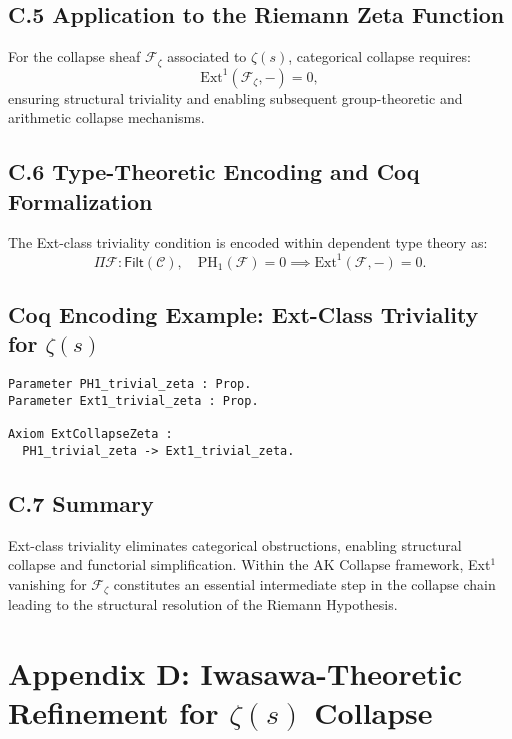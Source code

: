 \documentclass[11pt]{article}
\begin{document}
\subsection*{C.5 Application to the Riemann Zeta Function}

For the collapse sheaf $\mathcal{F}_{\zeta}$ associated to $\zeta(s)$, categorical collapse requires:
\[
\mathrm{Ext}^1(\mathcal{F}_{\zeta}, -) = 0,
\]
ensuring structural triviality and enabling subsequent group-theoretic and arithmetic collapse mechanisms.

\subsection*{C.6 Type-Theoretic Encoding and Coq Formalization}

The Ext-class triviality condition is encoded within dependent type theory as:
\[
\Pi \mathcal{F} : \mathsf{Filt}(\mathcal{C}), \quad \mathrm{PH}_1(\mathcal{F}) = 0 \implies \mathrm{Ext}^1(\mathcal{F}, -) = 0.
\]

\subsection*{Coq Encoding Example: Ext-Class Triviality for $\zeta(s)$}

\begin{lstlisting}[language=Coq, caption=Coq Formalization of Ext-Class Triviality for $\zeta(s)$, captionpos=b]
Parameter PH1_trivial_zeta : Prop.
Parameter Ext1_trivial_zeta : Prop.

Axiom ExtCollapseZeta :
  PH1_trivial_zeta -> Ext1_trivial_zeta.
\end{lstlisting}

\subsection*{C.7 Summary}

Ext-class triviality eliminates categorical obstructions, enabling structural collapse and functorial simplification. Within the AK Collapse framework, Ext$^1$ vanishing for $\mathcal{F}_{\zeta}$ constitutes an essential intermediate step in the collapse chain leading to the structural resolution of the Riemann Hypothesis.



\section*{Appendix D: Iwasawa-Theoretic Refinement for $\zeta(s)$ Collapse}
\end{document}
